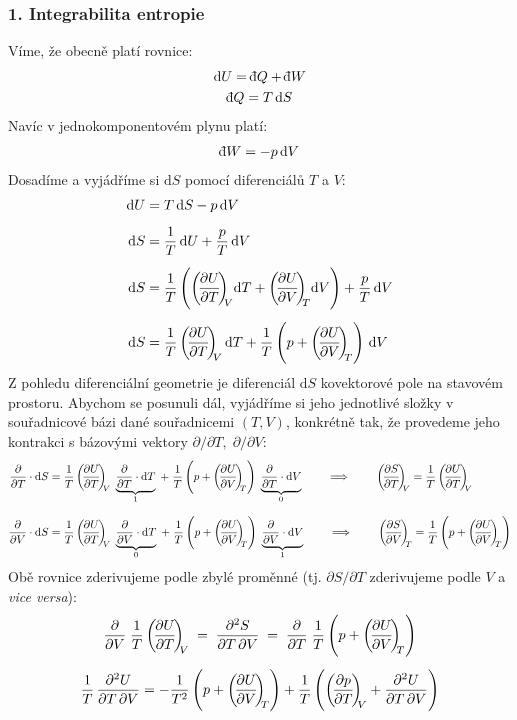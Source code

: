 \documentclass{article}
\def\vph{\vphantom}
\newcommand{\const}[1]{\text{#1}}
\renewcommand{\d}[1]{\const{d} #1}
\newcommand{\pd}[2]{\frac{\partial  #1}{\partial  #2}}
\newcommand{\di}[1]{\mathchar22\mkern-11mu \mathrm{d} #1}
\newcommand{\Pd}[3]{
    \vph{\Bigg|}
    \bigg(
        \hspace{-2pt}
        \pd{#1}{#2}
        \hspace{-2pt}
    \bigg)_{
        \hspace{-3pt} #3
    }
}
\begin{document}
\subsubsection*{1. Integrabilita entropie}
Víme, že obecně platí rovnice:
\begin{gather*}
    \d{U} = \di{Q} + \di{W}
    \\
    \di{Q} = T \, \d{S}
\end{gather*}
Navíc v jednokomponentovém plynu platí:
\begin{gather*}
    \di{W} = -p \, \d{V}
\end{gather*}
Dosadíme a vyjádříme si $\d{S}$ pomocí diferenciálů $T$ a $V$:
\begin{align*}
    \d{U} &= T \, \d{S} - p \, \d{V}
    \\[5pt]
    \d{S} &= \frac{1}{T} \, \d{U} + \frac{p}{T} \, \d{V}
    \\[5pt]
    \d{S} &= \frac{1}{T} \left( \Pd{U}{T}{V} \d{T} + \Pd{U}{V}{T} \d{V} \right) + \frac{p}{T} \, \d{V}
    \\[5pt]
    \d{S} &= \frac{1}{T} \, \Pd{U}{T}{V} \, \d{T} + \frac{1}{T} \left( p + \Pd{U}{V}{T} \right) \, \d{V}
\end{align*}
Z pohledu diferenciální geometrie je diferenciál $\d{S}$ kovektorové pole na stavovém prostoru. Abychom se posunuli dál, vyjádříme si jeho jednotlivé složky v souřadnicové bázi dané souřadnicemi $(T, V)$, konkrétně tak, že provedeme jeho kontrakci s bázovými vektory $\partial/\partial T, \; \partial/\partial V$:
\begin{align*}
    \pd{}{T} \cdot \d{S}
    &=
    \frac{1}{T} \, \Pd{U}{T}{V} \; \underbrace{\pd{}{T} \cdot \d{T}}_{1} \;+\; \frac{1}{T} \left( p + \Pd{U}{V}{T} \right) \; \underbrace{\pd{}{T} \cdot \d{V}}_{0}
    \qquad \implies \qquad
    \Pd{S}{T}{V} = \frac{1}{T} \, \Pd{U}{T}{V}
    \\[8pt]
    \pd{}{V} \cdot \d{S}
    &=
    \frac{1}{T} \, \Pd{U}{T}{V} \; \underbrace{\pd{}{V} \cdot \d{T}}_{0} \;+\; \frac{1}{T} \left( p + \Pd{U}{V}{T} \right) \; \underbrace{\pd{}{V} \cdot \d{V}}_{1}
    \qquad \implies \qquad
    \Pd{S}{V}{T} = \frac{1}{T} \left( p + \Pd{U}{V}{T} \right)
\end{align*}
Obě rovnice zderivujeme podle zbylé proměnné (tj. $\partial S/\partial T$ zderivujeme podle $V$ a \textit{vice versa}):
\begin{gather*}
    \pd{}{V} \; \frac{1}{T} \, \Pd{U}{T}{V}
    \;=\; \pd{^2 S}{T \, \partial V} \;=\;
    \pd{}{T} \; \frac{1}{T} \left( p + \Pd{U}{V}{T} \right)
    \\[5pt]
    \frac{1}{T} \, \pd{^2 U}{T \, \partial V}
    =
    -\frac{1}{T^2} \left( p + \Pd{U}{V}{T} \right)
    +\frac{1}{T} \left( \Pd{p}{T}{V} + \pd{^2 U}{T \, \partial V} \right)
\end{gather*}
\end{document}
